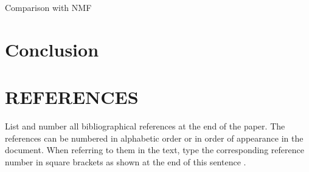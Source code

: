 \documentclass{article}
\begin{document}
Comparison with NMF

\section{Conclusion}
\label{sec:conclusion}



\vfill
\pagebreak



\section{REFERENCES}
\label{sec:ref}

List and number all bibliographical references at the end of the paper.  The references can be numbered in alphabetic order or in order of appearance in the document.  When referring to them in the text, type the corresponding reference number in square brackets as shown at the end of this sentence .



\end{document}
